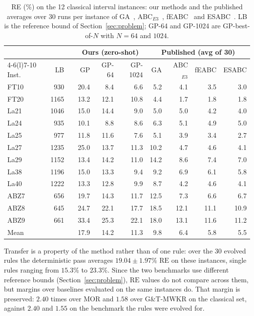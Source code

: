 \documentclass[review,authoryear,11pt]{elsarticle}
\newcommand{\RE}{\mathrm{RE}}
\begin{document}
\begin{table}[t]
\centering\small
\caption{RE (\%) on the 12 classical interval instances: our methods and the
published averages over 30 runs per instance of GA~\citep{DiazGA2020},
ABC$_{E3}$~\citep{DiazABC2022}, fEABC~\citep{DiazFEABC2023} and
ESABC~\citep{DiazICAE2023}. LB is the reference bound of
Section~\ref{sec:problem}; GP-64 and GP-1024 are GP-best-of-$N$ with
$N = 64$ and $1024$.}
\label{tab:classics}
\setlength{\tabcolsep}{4.5pt}
\begin{tabular}{lrrrrrrrrr}
\toprule
& & & \multicolumn{3}{c}{Ours (zero-shot)} &
\multicolumn{4}{c}{Published (avg of 30)} \\
\cmidrule(lr){4-6}\cmidrule(l){7-10}
Inst. & LB & & GP & GP-64 & GP-1024 &
GA & ABC$_{E3}$ & fEABC & ESABC \\
\midrule
FT10 & 930 & & 20.4 & 8.4 & 6.6 & 5.2 & 4.1 & 3.5 & 3.0 \\
FT20 & 1165 & & 13.2 & 12.1 & 10.8 & 4.4 & 1.7 & 1.8 & 1.8 \\
La21 & 1046 & & 15.0 & 14.4 & 9.0 & 5.0 & 5.0 & 4.2 & 4.0 \\
La24 & 935 & & 10.1 & 8.8 & 8.6 & 6.3 & 5.1 & 4.9 & 5.0 \\
La25 & 977 & & 11.8 & 11.6 & 7.6 & 5.1 & 3.9 & 3.4 & 2.7 \\
La27 & 1235 & & 25.0 & 13.7 & 11.3 & 10.2 & 4.7 & 4.6 & 4.1 \\
La29 & 1152 & & 13.4 & 14.2 & 11.0 & 14.2 & 8.6 & 7.4 & 7.0 \\
La38 & 1196 & & 15.0 & 13.3 & 9.4 & 9.2 & 6.9 & 6.1 & 5.8 \\
La40 & 1222 & & 13.3 & 12.8 & 9.9 & 8.7 & 4.2 & 4.6 & 4.1 \\
ABZ7 & 656 & & 19.7 & 14.3 & 11.7 & 12.5 & 7.3 & 6.6 & 6.7 \\
ABZ8 & 645 & & 24.7 & 22.1 & 17.7 & 18.5 & 12.1 & 11.1 & 10.9 \\
ABZ9 & 661 & & 33.4 & 25.3 & 22.1 & 18.0 & 13.1 & 11.6 & 11.2 \\
\midrule
Mean & & & 17.9 & 14.2 & 11.3 & 9.8 & 6.4 & 5.8 & 5.5 \\
\bottomrule
\end{tabular}
\end{table}

Transfer is a property of the method rather than of one rule: over the
30 evolved rules the deterministic pass averages $19.04 \pm 1.97\%$
$\RE$ on these instances, single rules ranging from $15.3\%$ to
$23.3\%$. Since the two benchmarks use different reference bounds
(Section~\ref{sec:problem}), $\RE$ values do not compare across them,
but margins over baselines evaluated on the same instances do. That
margin is preserved: $2.40$ times over MOR and $1.58$ over G\&T-MWKR on
the classical set, against $2.40$ and $1.55$ on the benchmark the rules
were evolved for.
\end{document}
